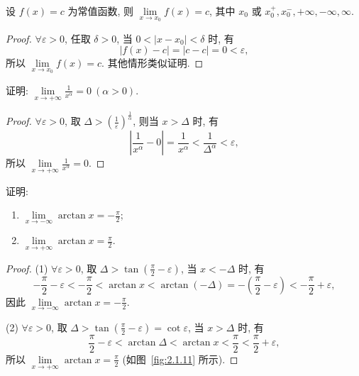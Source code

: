 \begin{example}\label{ex:2.1.4}
设 $f(x) = c$ 为常值函数, 则 $\lim\limits_{x \to x_0} f(x) = c$, 其中 $x_0$ 或 $x_0^+, x_0^-, +\infty, -\infty, \infty$.
\end{example}

\begin{proof}
$\forall\varepsilon>0$, 任取 $\delta>0$, 当 $0<|x-x_{0}|<\delta$ 时, 有
\[
|f(x)-c|=|c-c|=0<\varepsilon,
\]
所以 $\lim\limits_{x\to x_0}f(x)=c$. 其他情形类似证明.
\end{proof}

\begin{example}\label{ex:2.1.5}
证明: $\lim\limits_{x\to+\infty}\frac{1}{x^\alpha}=0\ (\alpha>0)$.
\end{example}

\begin{proof}
$\forall\varepsilon>0$, 取 $\Delta>\left(\frac{1}{\varepsilon}\right)^{\frac{1}{\alpha}}$, 则当 $x>\Delta$ 时, 有
\[
\left|\frac{1}{x^{\alpha}}-0\right|=\frac{1}{x^{\alpha}}<\frac{1}{\Delta^{\alpha}}<\varepsilon,
\]
所以 $\lim\limits_{x\to+\infty}\frac{1}{x^{\alpha}}=0$.
\end{proof}

\begin{example}\label{ex:2.1.6}
证明:
\begin{enumerate}[label=(\arabic*)]
  \item $\lim\limits_{x\to-\infty}\arctan x=-\frac{\pi}{2}$;
  \item $\lim\limits_{x \to +\infty} \arctan x = \frac{\pi}{2}$.
\end{enumerate}
\end{example}

\begin{proof}
(1) $\forall\varepsilon>0$, 取 $\Delta>\tan\left(\frac{\pi}{2}-\varepsilon\right)$, 当 $x<-\Delta$ 时, 有
\[
-\frac{\pi}{2}-\varepsilon<-\frac{\pi}{2}<\arctan x<\arctan(-\Delta)=-\left(\frac{\pi}{2}-\varepsilon\right)<-\frac{\pi}{2}+\varepsilon,
\]
因此 $\lim\limits_{x\to-\infty}\arctan x=-\frac{\pi}{2}$.

(2) $\forall\varepsilon>0$, 取 $\Delta>\tan\left(\frac{\pi}{2}-\varepsilon\right)=\cot\varepsilon$, 当 $x>\Delta$ 时, 有
\[
\frac{\pi}{2}-\varepsilon < \arctan\Delta < \arctan x < \frac{\pi}{2} < \frac{\pi}{2}+\varepsilon,
\]
所以 $\lim\limits_{x\to+\infty}\arctan x=\frac{\pi}{2}$ (如图~\ref{fig:2.1.11} 所示).
\end{proof}

